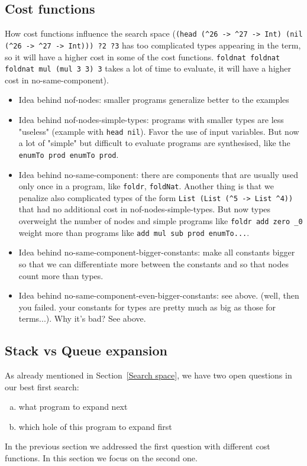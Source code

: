 \subsection{Cost functions}
How cost functions influence the search space (\lstinline!(head (^26 -> ^27 -> Int) (nil (^26 -> ^27 -> Int))) ?2 ?3! has too complicated types appearing in the term, so it will have a higher cost in some of the cost functions. \lstinline!foldnat foldnat foldnat mul (mul 3 3) 3! takes a lot of time to evaluate, it will have a higher cost in no-same-component).

\begin{itemize}
\item Idea behind nof-nodes: smaller programs generalize better to the examples
\item Idea behind nof-nodes-simple-types: programs with smaller types are less "useless" (example with \lstinline?head nil?). Favor the use of input variables. But now a lot of "simple" but difficult to evaluate programs are synthesised, like the \lstinline?enumTo prod enumTo prod?.
\item Idea behind no-same-component: there are components that are usually used only once in a program, like \lstinline?foldr?, \lstinline?foldNat?. Another thing is that we penalize also complicated types of the form \lstinline?List (List (^5 -> List ^4))? that had no additional cost in nof-nodes-simple-types. But now types overweight the number of nodes and simple programs like \lstinline?foldr add zero _0? weight more than programs like \lstinline?add mul sub prod enumTo...?.
\item Idea behind no-same-component-bigger-constants: make all constants bigger so that we can differentiate more between the constants and so that nodes count more than types.
\item Idea behind no-same-component-even-bigger-constants: see above. (well, then you failed. your constants for types are pretty much as big as those for terms...). Why it's bad? See above.
\end{itemize}

\subsection{Stack vs Queue expansion}
As already mentioned in Section~\ref{Search space}, we have two open questions in our best first search:
\begin{enumerate}[a.]
\item what program to expand next
\item which hole of this program to expand first
\end{enumerate}
In the previous section we addressed the first question with different cost functions. In this section we focus on the second one.

